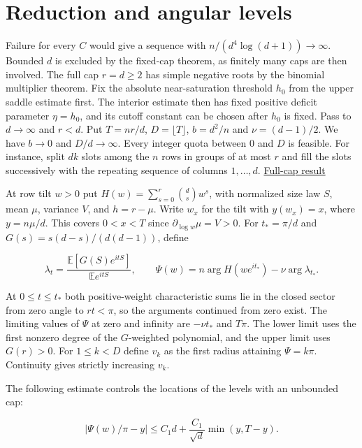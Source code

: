 \section{Reduction and angular levels}

Failure for every $C$ would give a sequence with $n/(d^4\log(d+1))\to\infty$. Bounded $d$ is excluded by the fixed-cap theorem, as finitely many caps are then involved. The full cap $r=d\ge2$ has simple negative roots by the binomial multiplier theorem. Fix the absolute near-saturation threshold $h_0$ from the upper saddle estimate first. The interior estimate then has fixed positive deficit parameter $\eta=h_0$, and its cutoff constant can be chosen after $h_0$ is fixed. Pass to $d\to\infty$ and $r<d$. Put $T=nr/d$, $D=\lfloor T\rfloor$, $b=d^2/n$ and $\nu=(d-1)/2$. We have $b\to0$ and $D/d\to\infty$. Every integer quota between 0 and $D$ is feasible. For instance, split $dk$ slots among the $n$ rows in groups of at most $r$ and fill the slots successively with the repeating sequence of columns $1,\ldots,d$. \href{https://github.com/ProgramComputer/open-math-research/blob/f7e10f84dd21fec44ca58c60bae0879d12ebd89b/topics/balanced-arrays/finite-linear-reduction.md}{Full-cap result}

At row tilt $w>0$ put $H(w)=\sum_{s=0}^r\binom ds w^s$, with normalized size law $S$, mean $\mu$, variance $V$, and $h=r-\mu$. Write $w_x$ for the tilt with $y(w_x)=x$, where $y=n\mu/d$. This covers $0<x<T$ since $\partial_{\log w}\mu=V>0$. For $t_*=\pi/d$ and $G(s)=s(d-s)/(d(d-1))$, define

\begin{equation*}
\lambda_t=\frac{\mathbb E[G(S)e^{itS}]}{\mathbb E e^{itS}},
\qquad \Psi(w)=n\arg H(we^{it_*})-\nu\arg\lambda_{t_*}.
\end{equation*}

At $0\le t\le t_*$ both positive-weight characteristic sums lie in the closed sector from zero angle to $rt<\pi$, so the arguments continued from zero exist. The limiting values of $\Psi$ at zero and infinity are $-\nu t_*$ and $T\pi$. The lower limit uses the first nonzero degree of the $G$-weighted polynomial, and the upper limit uses $G(r)>0$. For $1\le k<D$ define $v_k$ as the first radius attaining $\Psi=k\pi$. Continuity gives strictly increasing $v_k$.

The following estimate controls the locations of the levels with an unbounded cap:

\begin{equation}
|\Psi(w)/\pi-y|\le C_1 d+\frac{C_1}{\sqrt d}\min(y,T-y).
\tag{M1}
\end{equation}


